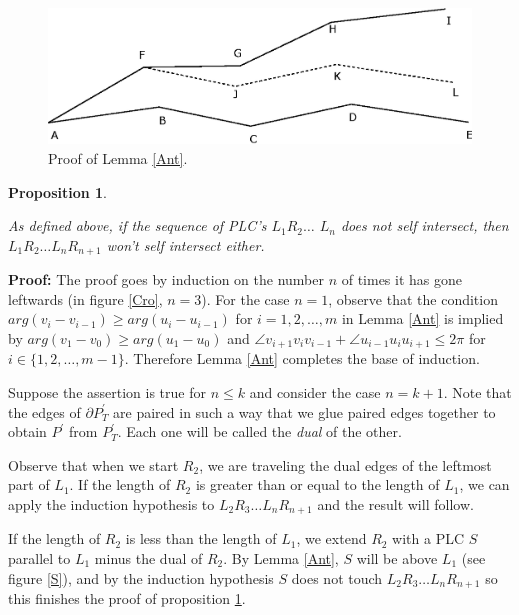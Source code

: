 \documentclass[openright, 12pt]{article}
\newtheorem{prop}[teorema]{Proposition}
\begin{document}
\begin{figure}[h]
\centering
{}
\includegraphics[scale=0.95]{arms.eps}
\caption{Proof of Lemma \ref{Ant}.}
\end{figure}





\begin{prop}\label{Zig}
{\rm As defined above, if the sequence of PLC's $L_1R_2\ldots$ 
$ L_n$ does not self intersect, then $L_1 R_2 \ldots L_nR_{n+1}$ won't self intersect either.  

}
\end{prop}




\textbf{Proof: }The proof goes by induction on the number $n$ of times it has gone leftwards (in figure \ref{Cro}, $n=3$). For the case $n=1$, observe that the condition $arg (v_{i} - v_{i-1} )\geq arg (u_{i} - u_{i-1})$ for $i =1, 2, \ldots, m$ in Lemma \ref{Ant} is implied by $arg (v_1 - v_0 )\geq arg (u_1 - u_0)$ and $\angle v_{i+1}v_iv_{i-1}+ \angle u_{i-1}u_iu_{i+1} \leq 2\pi$ for $i\in \{ 1,2, \ldots, m-1\}$. Therefore Lemma \ref{Ant} completes the base of induction.

Suppose the assertion is true for $n \leq k$ and consider the case $n=k+1$.  Note that the edges of $\partial P^{\prime}_T$ are paired in such a way that we glue paired edges together to obtain $P^{\prime}$ from $P ^{\prime}_T$. Each one will be called the \textit{dual} of the other.

Observe that when we start $R_2$, we are traveling the dual edges of the leftmost part of $L_1$. If the length of $R_2$ is greater than or equal to the length of $L_1$, we can apply the induction hypothesis to $L_2R_3 \ldots L_nR_{n+1}$ and the result will follow. 

If the length of $R_2$ is less than the length of $L_1$, we extend $R_2 $ with a PLC $S$ parallel to $L_1$ minus the dual of $R_2$. By Lemma \ref{Ant}, $S$ will be above $L_1$ (see figure \ref{S}), and by the induction hypothesis $S$ does not touch $L_2R_3 \ldots L_nR_{n+1}$ so this finishes the proof of proposition \ref{Zig}.
\end{document}
